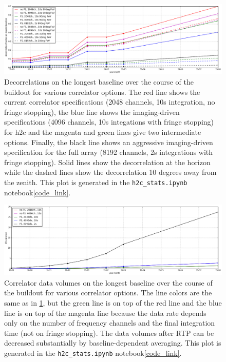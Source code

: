 \documentclass{article}
\begin{document}
\begin{figure}
\includegraphics[width=\textwidth]{spec_calcs/decorrelation.png} 
\caption{Decorrelations on the longest baseline over the course of the buildout for various correlator options. The red line shows the current 
correlator specifications (2048 channels, 10s integration, no fringe stopping), the blue line shows the imaging-driven specifications 
(4096 channels, 10s integations with fringe stopping) for h2c and the magenta and green lines give two intermediate options. 
Finally, the black line shows an aggressive imaging-driven specification for the full array (8192 channels, 2s integrations with fringe stopping). 
Solid lines show the decorrelation at the horizon while the dashed lines show the decorrelation 10 degrees away from the zenith. 
This plot is generated in the  \texttt{h2c\_stats.ipynb} notebook\cref{code_link}.}
\label{Fig:decorr}
\end{figure}

\begin{figure}
\includegraphics[width=\textwidth]{spec_calcs/corr_data_vols.png} 
\caption{Correlator data volumes on the longest baseline over the course of the buildout for various correlator options. 
The line colors are the same as in \ref{Fig:decorr}, but the green line is on top of the red line and the blue line is on top of the magenta line
because the data rate depends only on the number of frequency channels and the final integration time (not on fringe stopping). 
The data volumes after RTP can be decreased substantially by baseline-dependent averaging.
This plot is generated in the  \texttt{h2c\_stats.ipynb} notebook\cref{code_link}.}
\label{Fig:corr_vol}
\end{figure}
\end{document}
